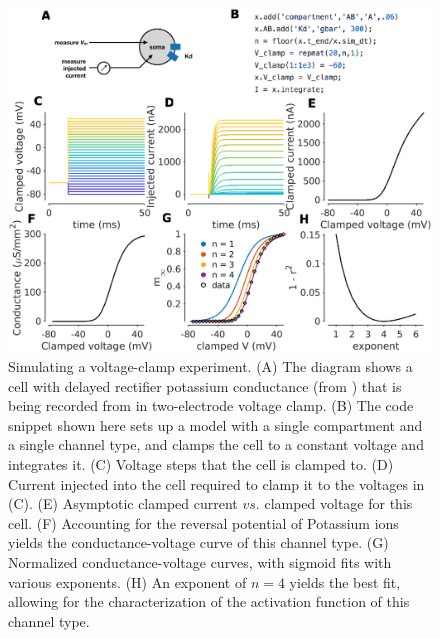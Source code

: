\documentclass{frontiersSCNS} %
\begin{document}
\begin{figure}[!htb]
	\centering
	\includegraphics[width=1.0\linewidth]{gfx/figure_clamp}
	\caption{Simulating a voltage-clamp experiment. (A) The diagram shows a cell with delayed rectifier potassium conductance (from \cite{liuModelNeuronActivitydependent1998}) that is being recorded from in two-electrode voltage clamp. (B) The code snippet shown here sets up a model with a single compartment and a single channel type, and clamps the cell to a constant voltage and integrates it. (C) Voltage steps that the cell is clamped to. (D) Current injected into the cell required to clamp it to the voltages in (C). (E) Asymptotic clamped current $vs.$ clamped voltage for this cell. (F) Accounting for the reversal potential of Potassium ions yields the conductance-voltage curve of this channel type. (G) Normalized conductance-voltage curves, with sigmoid fits with various exponents. (H) An exponent of $n=4$ yields the best fit, allowing for the characterization of the activation function of this channel type. }
	\label{fig:figureclamp}
\end{figure}
\end{document}
